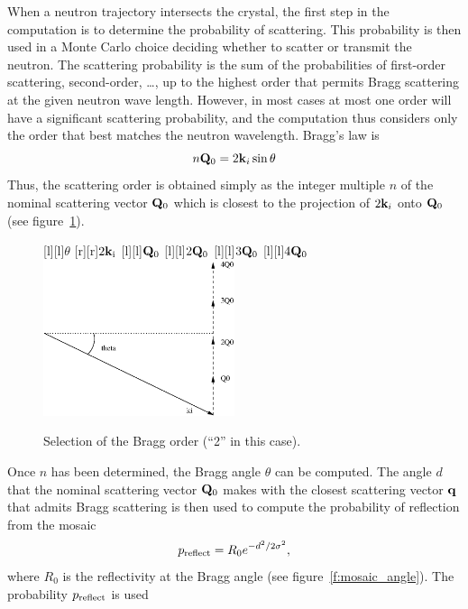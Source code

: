When a neutron trajectory intersects the crystal, the first step in the
computation is to determine the probability of scattering. This
probability is then used in a Monte Carlo choice deciding whether to
scatter or transmit the neutron. The scattering probability is the sum
of the probabilities of first-order scattering, second-order, \ldots, up
to the highest order that permits Bragg scattering at the given neutron
wave length. However, in most cases at most one order will have a
significant scattering probability, and the computation thus considers
only the order that best matches the neutron wavelength. Bragg's law is
%
$$ n{\bf Q}_0 = 2{\bf k}_i\sin\theta $$
%
Thus, the scattering order is obtained simply as the integer multiple
$n$ of the nominal scattering vector ${\bf Q}_0$ which is closest to the
projection of $2{\bf k}_i$ onto ${\bf Q}_0$ (see
figure~\ref{f:mosaic_order}).
%  
%  
\begin{figure}
  \begin{center}
    [l][l]{$\theta$}
    [r][r]{$2{\bf k}_{\rm i}$}
    [l][l]{${\bf Q}_0$}
    [l][l]{$2{\bf Q}_0$}
    [l][l]{$3{\bf Q}_0$}
    [l][l]{$4{\bf Q}_0$}
    \includegraphics[width=0.5\textwidth]{figures/mosaic_order.eps}
  \end{center}
\caption{Selection of the Bragg order (``2'' in this case).}
\label{f:mosaic_order}
\end{figure}
%
Once $n$ has been determined, the Bragg angle $\theta$ can be
computed. The angle $d$ that the nominal scattering vector ${\bf Q}_0$
makes with the closest scattering vector ${\bf q}$ that admits Bragg
scattering is then used to compute the probability of reflection from
the mosaic
$$ p_{\rm reflect} = R_0 e^{-d^2/2\sigma^2}, $$
where $R_0$ is the reflectivity at the Bragg angle (see
figure~\ref{f:mosaic_angle}). The probability $p_{\rm reflect}$ is used
